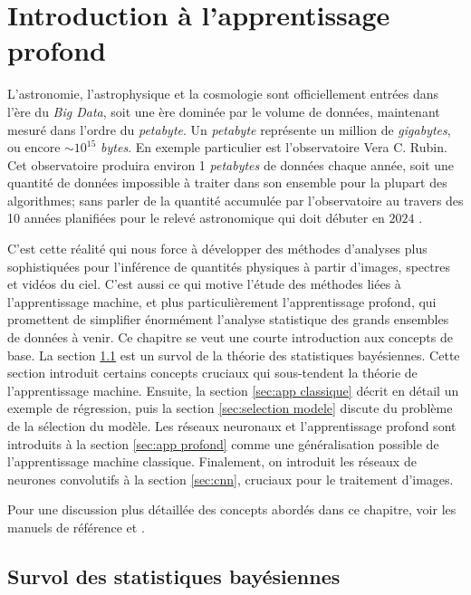 \chapter{Introduction à l'apprentissage profond}\label{chap:intro ml}

L'astronomie, l'astrophysique et la cosmologie sont officiellement entrées dans l'ère du \textit{Big Data}, 
soit une ère dominée par le volume de données, maintenant mesuré dans l'ordre du \textit{petabyte}. Un \textit{petabyte} représente 
un million de \textit{gigabytes}, ou encore $\sim 10^{15}$ \textit{bytes}. 
En exemple particulier est l'observatoire Vera C. Rubin. Cet observatoire produira environ 1 \textit{petabytes} de données chaque année, soit une quantité de données 
impossible à traiter dans son ensemble pour la plupart des algorithmes; 
sans parler de la quantité accumulée par l'observatoire au travers des 10 années planifiées pour le relevé astronomique qui doit débuter 
en $2024$ \citep{lsst2009,lsst2021}. 

C'est cette réalité qui nous force à développer des méthodes d'analyses plus sophistiquées pour l'inférence de quantités physiques à partir 
d'images, spectres et vidéos du ciel. C'est aussi ce qui motive l'étude des méthodes liées à l'apprentissage machine, et plus particulièrement 
l'apprentissage profond, qui promettent de simplifier énormément l'analyse statistique des grands ensembles de données à venir. Ce chapitre se veut 
une courte introduction aux concepts de base. 
La section \ref{sec:bayes} est un survol de la théorie des statistiques bayésiennes. Cette section introduit certains concepts cruciaux qui sous-tendent la 
théorie de l'apprentissage machine. Ensuite, la section \ref{sec:app classique} décrit en détail un exemple de régression, 
puis la section \ref{sec:selection modele} discute du problème de la sélection du modèle.
Les réseaux neuronaux et l'apprentissage profond sont introduits à la section \ref{sec:app profond} 
comme une généralisation possible de l'apprentissage machine classique. Finalement, on introduit les 
réseaux de neurones convolutifs à la section \ref{sec:cnn}, cruciaux pour le traitement d'images.

Pour une discussion plus détaillée des concepts abordés dans ce chapitre, voir les manuels de référence \citet{Goodfellow2016} et \citet{Bishop2007}.

\section{Survol des statistiques bayésiennes}\label{sec:bayes}

